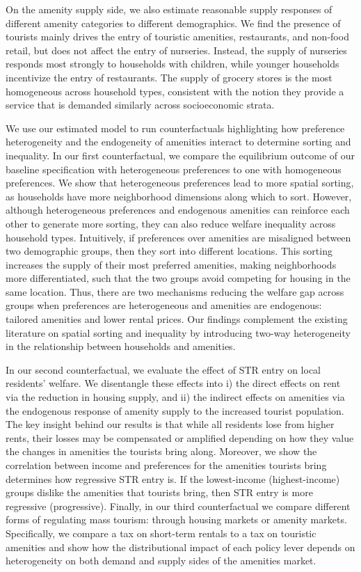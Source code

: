 \documentclass[11pt]{article}
\begin{document}
On the amenity supply side, we also estimate reasonable supply responses of different amenity categories to different demographics. We find the presence of tourists mainly drives the entry of touristic amenities, restaurants, and non-food retail, but does not affect the entry of nurseries. Instead, the supply of nurseries responds most strongly to households with children, while younger households incentivize the entry of restaurants. The supply of grocery stores is the most homogeneous across household types, consistent with the notion they provide a service that is demanded similarly across socioeconomic strata. 


We use our estimated model to run counterfactuals highlighting how preference heterogeneity and the endogeneity of amenities interact to determine sorting and inequality. In our first counterfactual, we compare the equilibrium outcome of our baseline specification with heterogeneous preferences to one with homogeneous preferences. We show that heterogeneous preferences lead to more spatial sorting, as households have more neighborhood dimensions along which to sort. However, although heterogeneous preferences and endogenous amenities can reinforce each other to generate more sorting, they can also reduce welfare inequality across household types. Intuitively, if preferences over amenities are misaligned between two demographic groups, then they sort into different locations. This sorting increases the supply of their most preferred amenities, making neighborhoods more differentiated, such that the two groups avoid competing for housing in the same location. Thus, there are two mechanisms reducing the welfare gap across groups when preferences are heterogeneous and amenities are endogenous: tailored amenities and lower rental prices. Our findings complement the existing literature on spatial sorting and inequality by introducing two-way heterogeneity in the relationship between households and amenities.

In our second counterfactual, we evaluate the effect of STR entry on local residents' welfare. We disentangle these effects into i) the direct effects on rent via the reduction in housing supply, and ii) the indirect effects on amenities via the endogenous response of amenity supply to the increased tourist population. The key insight behind our results is that while all residents lose from higher rents, their losses may be compensated or amplified depending on how they value the changes in amenities the tourists bring along. Moreover, we show the correlation between income and preferences for the amenities tourists bring determines how regressive STR entry is. If the lowest-income (highest-income) groups dislike the amenities that tourists bring, then STR entry is more regressive (progressive). Finally, in our third counterfactual we compare different forms of regulating mass tourism: through housing markets or amenity markets. Specifically, we compare a tax on short-term rentals to a tax on touristic amenities and show how the distributional impact of each policy lever depends on heterogeneity on both demand and supply sides of the amenities market.
\end{document}
